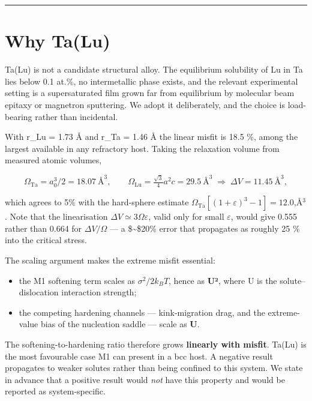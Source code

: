 \documentclass[11pt,a4paper]{article}
\providecommand{\tightlist}{%
  \setlength{\itemsep}{0pt}\setlength{\parskip}{0pt}}
\begin{document}
\begin{center}\rule{0.5\linewidth}{0.5pt}\end{center}

\hypertarget{why-talu}{%
\section{Why Ta(Lu)}\label{sec:why-talu}}

Ta(Lu) is not a candidate structural alloy. The equilibrium solubility of Lu in Ta lies below 0.1 at.\%, no intermetallic phase exists, and the relevant experimental setting is a supersaturated film grown far from equilibrium by molecular beam epitaxy or magnetron sputtering. We adopt it deliberately, and the choice is load-bearing rather than incidental.

With r\_Lu = 1.73 Å and r\_Ta = 1.46 Å the linear misfit is 18.5 \%, among the largest available in any refractory host. Taking the relaxation volume from measured atomic volumes,

\[\Omega_{\mathrm{Ta}} = a_0^3/2 = 18.07\ \text{\AA}^3,\qquad \Omega_{\mathrm{Lu}} = \tfrac{\sqrt{3}}{4}a^2c = 29.5\ \text{\AA}^3 \;\Longrightarrow\; \Delta V = 11.45\ \text{\AA}^3,\]

which agrees to 5\% with the hard-sphere estimate \(\Omega_{\mathrm{Ta}}[(1+\varepsilon)^3-1] = 12.0\),\AA\(^3\). Note that the linearisation \(\Delta V \simeq 3\Omega\varepsilon\), valid only for small \(\varepsilon\), would give 0.555 rather than 0.664 for \(\Delta V/\Omega\) --- a \$\sim\$20\% error that propagates as roughly 25 \% into the critical stress.

The scaling argument makes the extreme misfit essential:

\begin{itemize}
\tightlist
\item
  the M1 softening term scales as \(\sigma^2/2k_BT\), hence as \textbf{U²}, where U is the solute--dislocation interaction strength;
\item
  the competing hardening channels --- kink-migration drag, and the extreme-value bias of the nucleation saddle --- scale as \textbf{U}.
\end{itemize}

The softening-to-hardening ratio therefore grows \textbf{linearly with misfit}. Ta(Lu) is the most favourable case M1 can present in a bcc host. A negative result propagates to weaker solutes rather than being confined to this system. We state in advance that a positive result would \emph{not} have this property and would be reported as system-specific.
\end{document}
